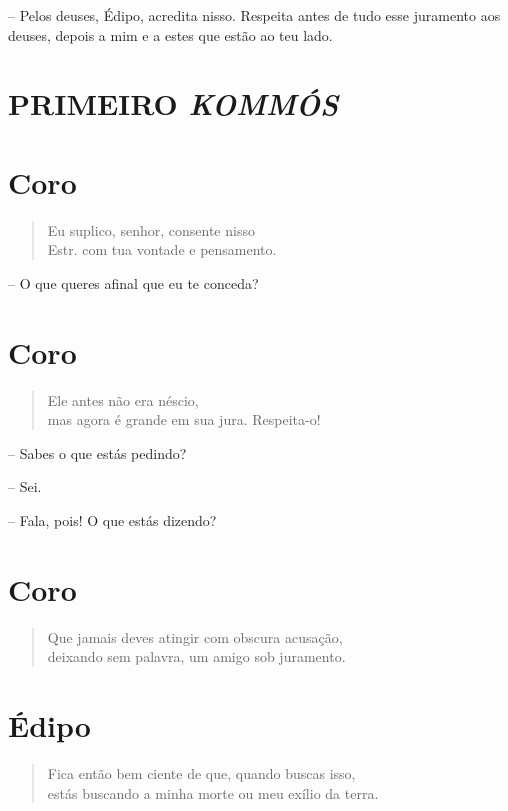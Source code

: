  --   Pelos deuses, Édipo, acredita nisso. Respeita antes de tudo esse
juramento aos deuses, depois a mim e a estes que estão ao teu lado.

\section{PRIMEIRO \emph{KOMMÓS}}


\section{Coro} 

\begin{verse}Eu suplico, senhor, consente nisso\\ Estr.
com tua vontade e pensamento. 
\end{verse}

 --   O que queres afinal que eu te conceda?


\section{Coro} 

\begin{verse}Ele antes não era néscio,\\
mas agora é grande em sua jura. Respeita-o!
\end{verse}

 --   Sabes o que estás pedindo?

 --   Sei.

 --   Fala, pois! O que estás dizendo?


\section{Coro} 

\begin{verse}Que jamais deves atingir com obscura acusação,\\
deixando sem palavra, um amigo sob juramento.
\end{verse}

\section{Édipo} 

\begin{verse}Fica então bem ciente de que, quando buscas isso,\\
estás buscando a minha morte ou meu exílio da terra.
\end{verse}


